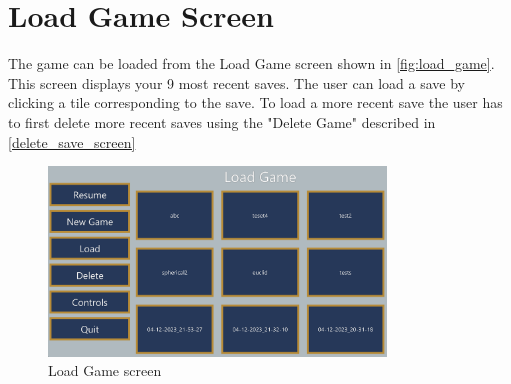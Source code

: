 \section{Load Game Screen}
The game can be loaded from the Load Game screen shown in \autoref{fig:load_game}.
This screen displays your 9 most recent saves.
The user can load a save by clicking a tile corresponding to the save.
To load a more recent save the user has to first delete more recent saves using the "Delete Game" described in \autoref{delete_save_screen}

\begin{figure}[H]
    \centering
    \includegraphics[width=0.8\textwidth]{chapters/user_manual/resources/load-game.png}
    \caption{Load Game screen}
    \label{fig:load_game}
\end{figure}